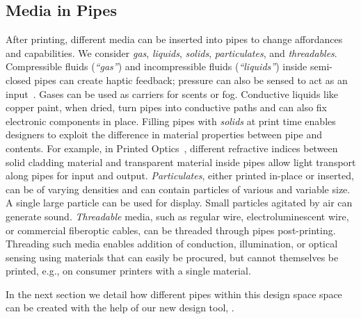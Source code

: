 \subsection{Media in Pipes}
After printing, different media can be inserted into pipes to change affordances and capabilities. We consider \emph{gas}, \emph{liquids}, \emph{solids}, \emph{particulates}, and \emph{threadables}. 
%
Compressible fluids (\emph{``gas''}) and incompressible fluids (\emph{``liquids''})  inside semi-closed pipes can create haptic feedback; pressure can also be sensed to act as an input~\cite{Slyper-shape}. Gases can be used as carriers for scents or fog. Conductive liquids like copper paint, when dried, turn pipes into conductive paths and can also fix electronic components in place.
%
Filling pipes with \emph{solids} at print time enables designers to exploit the difference in material properties between pipe and contents. For example, in Printed Optics~\cite{Willis-printedoptics}, different refractive indices between solid cladding material and transparent material inside pipes allow light transport along pipes for input and output.
%
\emph{Particulates}, either printed in-place or inserted, can be of varying densities and can contain particles of various and variable size.  A single large particle can be used for display.  Small particles agitated by air can generate sound.
%
\emph{Threadable} media, such as regular wire, electroluminescent wire, or commercial fiberoptic cables, can be threaded through pipes post-printing. Threading such media enables addition of conduction, illumination, or optical sensing using materials that can easily be procured, but cannot themselves be printed, e.g., on consumer printers with a single material. 

In the next section we detail how different pipes within this design space space can be created with the help of our new design tool, \systemnamenospace.
